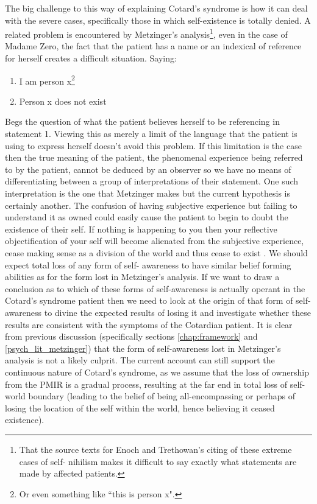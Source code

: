 The big challenge to this way of explaining Cotard's syndrome is how it can deal with the severe cases, specifically those in which self-existence is totally denied. A related problem is encountered by Metzinger's analysis\footnote{That the source texts for Enoch and Trethowan's citing of these extreme cases of self- nihilism makes it difficult to say exactly what statements are made by affected patients.}, even in the case of Madame Zero, the fact that the patient has a name or an indexical of reference for herself creates a difficult situation. Saying:
\begin{enumerate}
    \item I am person x\footnote{Or even something like ``this is person x".}
    \item Person x does not exist
\end{enumerate}
Begs the question of what the patient believes herself to be referencing in statement 1. Viewing this as merely a limit of the language that the patient is using to express herself doesn't avoid this problem. If this limitation is the case then the true meaning of the patient, the phenomenal experience being referred to by the patient, cannot be deduced by an observer so we have no means of differentiating between a group of interpretations of their statement. One such interpretation is the one that Metzinger makes but the current hypothesis is certainly another. The confusion of having subjective experience but failing to understand it as owned could easily cause the patient to begin to doubt the existence of their self. If nothing is happening to you then your reflective objectification of your self will become alienated from the subjective experience, cease making sense as a division of the world and thus cease to exist \cite[p. 313]{metzinger2003}. We should expect total loss of any form of self- awareness to have similar belief forming abilities as for the form lost in Metzinger's analysis. If we want to draw a conclusion as to which of these forms of self-awareness is actually operant in the Cotard's syndrome patient then we need to look at the origin of that form of self-awareness to divine the expected results of losing it and investigate whether these results are consistent with the symptoms of the Cotardian patient. It is clear from previous discussion (specifically sections \ref{chap:framework} and \ref{psych_lit_metzinger}) that the form of self-awareness lost in Metzinger's analysis is not a likely culprit. The current account can still support the continuous nature of Cotard's syndrome, as we assume that the loss of ownership from the PMIR is a gradual process, resulting at the far end in total loss of self-world boundary (leading to the belief of being all-encompassing or perhaps of losing the location of the self within the world, hence believing it ceased existence).

